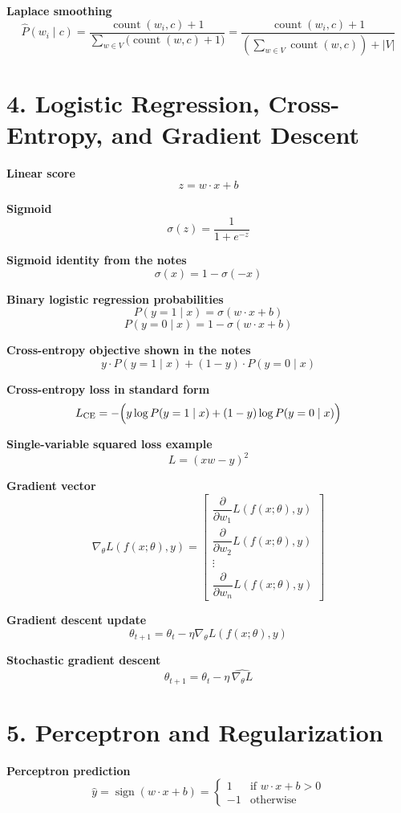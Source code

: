 \documentclass[11pt]{article}
\begin{document}
\textbf{Laplace smoothing}
\[
\hat{P}(w_i \mid c) =
\frac{\operatorname{count}(w_i, c)+1}
{\sum_{w \in V}\bigl(\operatorname{count}(w, c)+1\bigr)}
=
\frac{\operatorname{count}(w_i, c)+1}
{\left(\sum_{w \in V}\operatorname{count}(w, c)\right)+|V|}
\]

\section*{4. Logistic Regression, Cross-Entropy, and Gradient Descent}

\textbf{Linear score}
\[
z = w \cdot x + b
\]

\textbf{Sigmoid}
\[
\sigma(z) = \frac{1}{1 + e^{-z}}
\]

\textbf{Sigmoid identity from the notes}
\[
\sigma(x) = 1 - \sigma(-x)
\]

\textbf{Binary logistic regression probabilities}
\[
P(y=1 \mid x) = \sigma(w \cdot x + b)
\]
\[
P(y=0 \mid x) = 1 - \sigma(w \cdot x + b)
\]

\textbf{Cross-entropy objective shown in the notes}
\[
y \cdot P(y=1 \mid x) + (1-y)\cdot P(y=0 \mid x)
\]

\textbf{Cross-entropy loss in standard form}
\[
L_{\text{CE}} = -\Bigl(y \log P(y=1 \mid x) + (1-y)\log P(y=0 \mid x)\Bigr)
\]

\textbf{Single-variable squared loss example}
\[
L = (xw - y)^2
\]

\textbf{Gradient vector}
\[
\nabla_{\theta} L(f(x;\theta), y)
=
\begin{bmatrix}
\dfrac{\partial}{\partial w_1} L(f(x;\theta), y) \\
\dfrac{\partial}{\partial w_2} L(f(x;\theta), y) \\
\vdots \\
\dfrac{\partial}{\partial w_n} L(f(x;\theta), y)
\end{bmatrix}
\]

\textbf{Gradient descent update}
\[
\theta_{t+1} = \theta_t - \eta \nabla_{\theta} L(f(x;\theta), y)
\]

\textbf{Stochastic gradient descent}
\[
\theta_{t+1} = \theta_t - \eta \,\widehat{\nabla_{\theta} L}
\]

\section*{5. Perceptron and Regularization}

\textbf{Perceptron prediction}
\[
\hat{y} = \operatorname{sign}(w \cdot x + b)
=
\begin{cases}
1 & \text{if } w \cdot x + b > 0 \\
-1 & \text{otherwise}
\end{cases}
\]
\end{document}
